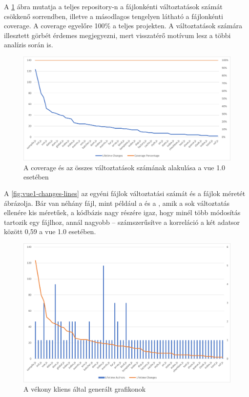 A \ref{fig:vue1-cov-changes} ábra mutatja a teljes repository-n a fájlonkénti változtatások számát csökkenő sorrendben, illetve a másodlagos tengelyen látható a fájlonkénti coverage. A coverage egyelőre 100\% a teljes projekten. A változtatások számára illesztett görbét érdemes megjegyezni, mert visszatérő motívum lesz a többi analízis során is.

\begin{figure}[H]
    \centering
    \includegraphics[width=1\textwidth]{images/vue/vue1-lifetime-changes.png}
    \caption{A coverage és az összes változtatások számának alakulása a vue 1.0 esetében}
    \label{fig:vue1-cov-changes}
\end{figure}

A \ref{fig:vue1-changes-lines} az egyéni fájlok változtatási számát és a fájlok méretét ábrázolja. Bár van néhány fájl, mint például a  és a , amik a sok változtatás ellenére kis méretűek, a kódbázis nagy részére igaz, hogy minél több módosítás tartozik egy fájlhoz, annál nagyobb -- számszerűsítve a korreláció a két adatsor között 0,59 a vue 1.0 esetében.


\begin{figure}[H]
    \centering
    \includegraphics[width=1\textwidth]{images/vue/vue1-lifetimechanges-authors.png}
    \caption{A vékony kliens által generált grafikonok}
    \label{fig:vue1-changes-authors}
\end{figure}

